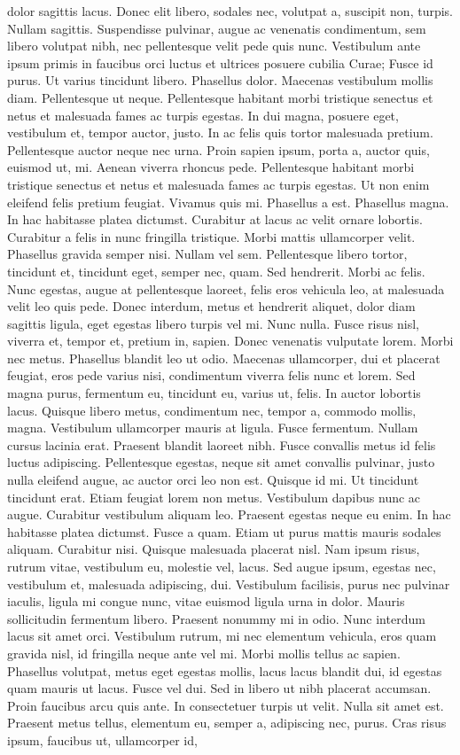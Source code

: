 dolor sagittis lacus. Donec elit libero, sodales nec, volutpat a, suscipit non, turpis. Nullam sagittis. Suspendisse pulvinar, augue ac venenatis condimentum, sem libero volutpat nibh, nec pellentesque velit pede quis nunc. Vestibulum ante ipsum primis in faucibus orci luctus et ultrices posuere cubilia Curae; Fusce id purus. Ut varius tincidunt libero. Phasellus dolor. Maecenas vestibulum mollis diam. Pellentesque ut neque. Pellentesque habitant morbi tristique senectus et netus et malesuada fames ac turpis egestas. In dui magna, posuere eget, vestibulum et, tempor auctor, justo. In ac felis quis tortor malesuada pretium. Pellentesque auctor neque nec urna. Proin sapien ipsum, porta a, auctor quis, euismod ut, mi. Aenean viverra rhoncus pede. Pellentesque habitant morbi tristique senectus et netus et malesuada fames ac turpis egestas. Ut non enim eleifend felis pretium feugiat. Vivamus quis mi. Phasellus a est. Phasellus magna. In hac habitasse platea dictumst. Curabitur at lacus ac velit ornare lobortis. Curabitur a felis in nunc fringilla tristique. Morbi mattis ullamcorper velit. Phasellus gravida semper nisi. Nullam vel sem. Pellentesque libero tortor, tincidunt et, tincidunt eget, semper nec, quam. Sed hendrerit. Morbi ac felis. Nunc egestas, augue at pellentesque laoreet, felis eros vehicula leo, at malesuada velit leo quis pede. Donec interdum, metus et hendrerit aliquet, dolor diam sagittis ligula, eget egestas libero turpis vel mi. Nunc nulla. Fusce risus nisl, viverra et, tempor et, pretium in, sapien. Donec venenatis vulputate lorem. Morbi nec metus. Phasellus blandit leo ut odio. Maecenas ullamcorper, dui et placerat feugiat, eros pede varius nisi, condimentum viverra felis nunc et lorem. Sed magna purus, fermentum eu, tincidunt eu, varius ut, felis. In auctor lobortis lacus. Quisque libero metus, condimentum nec, tempor a, commodo mollis, magna. Vestibulum ullamcorper mauris at ligula. Fusce fermentum. Nullam cursus lacinia erat. Praesent blandit laoreet nibh. Fusce convallis metus id felis luctus adipiscing. Pellentesque egestas, neque sit amet convallis pulvinar, justo nulla eleifend augue, ac auctor orci leo non est. Quisque id mi. Ut tincidunt tincidunt erat. Etiam feugiat lorem non metus. Vestibulum dapibus nunc ac augue. Curabitur vestibulum aliquam leo. Praesent egestas neque eu enim. In hac habitasse platea dictumst. Fusce a quam. Etiam ut purus mattis mauris sodales aliquam. Curabitur nisi. Quisque malesuada placerat nisl. Nam ipsum risus, rutrum vitae, vestibulum eu, molestie vel, lacus. Sed augue ipsum, egestas nec, vestibulum et, malesuada adipiscing, dui. Vestibulum facilisis, purus nec pulvinar iaculis, ligula mi congue nunc, vitae euismod ligula urna in dolor. Mauris sollicitudin fermentum libero. Praesent nonummy mi in odio. Nunc interdum lacus sit amet orci. Vestibulum rutrum, mi nec elementum vehicula, eros quam gravida nisl, id fringilla neque ante vel mi. Morbi mollis tellus ac sapien. Phasellus volutpat, metus eget egestas mollis, lacus lacus blandit dui, id egestas quam mauris ut lacus. Fusce vel dui. Sed in libero ut nibh placerat accumsan. Proin faucibus arcu quis ante. In consectetuer turpis ut velit. Nulla sit amet est. Praesent metus tellus, elementum eu, semper a, adipiscing nec, purus. Cras risus ipsum, faucibus ut, ullamcorper id, 